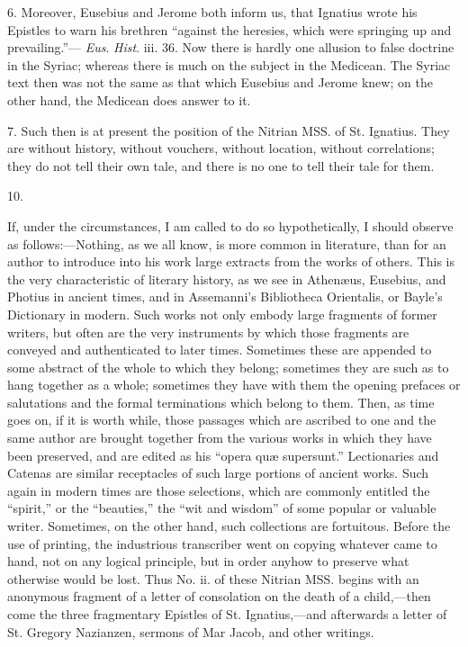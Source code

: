 6. Moreover, Eusebius and
Jerome both inform us, that Ignatius wrote his Epistles to warn his
brethren ``against the heresies, which were springing up and
prevailing.''— \emph{Eus}. \emph{Hist}. iii. 36. Now there is
hardly one allusion to false doctrine in the Syriac; whereas there is
much on the subject in the Medicean. The Syriac text then was not the
same as that which Eusebius and Jerome knew; on the other hand, the
Medicean does answer to it.

7. Such then is at present the
position of the Nitrian MSS. of St. Ignatius. They are without
history, without vouchers, without location, without correlations;
they do not tell their own tale, and there is no one to tell their
tale for them.

10.

If, under the circumstances, I
am called to do so hypothetically, I should observe as
follows:—Nothing, as we all know, is more common in literature, than
for an author to introduce into his work large extracts from the works
of others. This is the very characteristic of literary history, as we
see in Athenæus, Eusebius, and Photius in ancient times, and in
Assemanni's Bibliotheca Orientalis, or Bayle's Dictionary in modern.
Such works not only embody large fragments of former writers, but
often are the very instruments by which those fragments are conveyed
and authenticated to later times. Sometimes these are appended to some
abstract of the whole to which they belong; sometimes they are such as
to hang together as a whole; sometimes they have with them the opening
prefaces or salutations and the formal terminations which belong to
them. Then, as time goes on, if it is worth while, those passages
which are ascribed to one and the same author are brought together
from the various works in which they have been preserved, and
are edited as his ``opera quæ supersunt.'' Lectionaries and Catenas are
similar receptacles of such large portions of ancient works. Such
again in modern times are those selections, which are commonly
entitled the ``spirit,'' or the ``beauties,'' the ``wit and wisdom'' of some
popular or valuable writer. Sometimes, on the other hand, such
collections are fortuitous. Before the use of printing, the
industrious transcriber went on copying whatever came to hand, not on
any logical principle, but in order anyhow to preserve what otherwise
would be lost. Thus No. ii. of these Nitrian MSS. begins with an
anonymous fragment of a letter of consolation on the death of a
child,—then come the three fragmentary Epistles of St.
Ignatius,—and afterwards a letter of St. Gregory Nazianzen, sermons
of Mar Jacob, and other writings.

